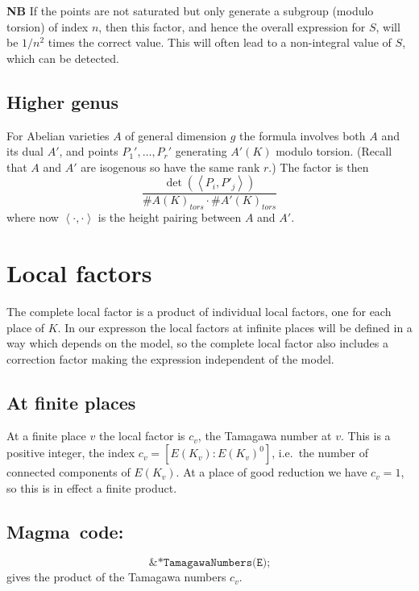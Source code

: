 \documentclass{amsart}
\newcommand{\software}[1]{\textsf{#1}} %
\newcommand{\Magma}{\software{Magma}{}\ }
\begin{document}
\textbf{NB} If the points are not saturated but only generate a
subgroup (modulo torsion) of index \(n\), then this factor, and hence
the overall expression for \(S\), will be \(1/n^2\) times the correct
value. This will often lead to a non-integral value of \(S\),
which can be detected.

\subsection{Higher genus}\label{higher-genus}

For Abelian varieties \(A\) of general dimension \(g\) the formula
involves both \(A\) and its dual \(A'\), and points \(P_1',\dots,P_r'\)
generating \(A'(K)\) modulo torsion. (Recall that \(A\) and \(A'\) are
isogenous so have the same rank \(r\).) The factor is then
\[\frac{\det(\left\langle P_i,P'_j\right\rangle )}{\#A(K)_{tors}\cdot \#A'(K)_{tors}}\]
where now \(\left<\cdot,\cdot\right>\) is the height pairing between
\(A\) and \(A'\).

\section{Local factors}\label{local-factors}

The complete local factor is a product of individual local factors, one
for each place of \(K\). In our expresson the local factors at infinite
places will be defined in a way which depends on the model, so the
complete local factor also includes a correction factor making the
expression independent of the model.

\subsection{At finite places}\label{at-finite-places}

At a finite place \(v\) the local factor is \(c_v\), the Tamagawa number
at \(v\). This is a positive integer, the index
\(c_v = [E(K_v):E(K_v)^0]\), i.e.~the number of connected components of
\(E(K_v)\). At a place of good reduction we have \(c_v=1\), so this is
in effect a finite product.

\subsection{\Magma code:}\label{magma-4}

\[
\texttt{\&*TamagawaNumbers(E);}
\]
gives the product of the Tamagawa numbers \(c_v\).
\end{document}
